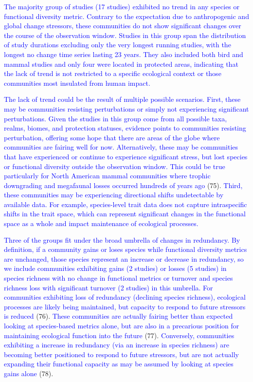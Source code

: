 \documentclass{article}
\begin{document}
\textcolor{blue}{The majority group of studies (17 studies) exhibited no trend in any species or functional diversity metric. Contrary to the expectation due to anthropogenic and global change stressors, these communities do not show significant changes over the course of the observation window. Studies in this group span the distribution of study durations excluding only the very longest running studies, with the longest no change time series lasting 23 years. They also included both bird and mammal studies and only four were located in protected areas, indicating that the lack of trend is not restricted to a specific ecological context or those communities most insulated from human impact.}

\textcolor{blue}{The lack of trend could be the result of multiple possible scenarios. First, these may be communities resisting perturbations or simply not experiencing significant perturbations. Given the studies in this group come from all possible taxa, realms, biomes, and protection statuses, evidence points to communities resisting perturbation, offering some hope that there are areas of the globe where communities are fairing well for now. Alternatively, these may be communities that have experienced or continue to experience significant stress, but lost species or functional diversity outside the observation window. This could be true particularly for North American mammal communities where trophic downgrading and megafaunal losses occurred hundreds of years ago }(75).
\textcolor{blue}{Third, these communities may be experiencing directional shifts undetectable by available data. For example, species-level trait data does not capture intraspecific shifts in the trait space, which can represent significant changes in the functional space as a whole and impact maintenance of ecological processes.}

\textcolor{blue}{Three of the groups fit under the broad umbrella of changes in redundancy. By definition, if a community gains or loses species while functional diversity metrics are unchanged, those species represent an increase or decrease in redundancy, so we include communities exhibiting gains (2 studies) or losses (5 studies) in species richness with no change in functional metrics or turnover and species richness loss with significant turnover (2 studies) in this umbrella. For communities exhibiting loss of redundancy (declining species richness), ecological processes are likely being maintained, but capacity to respond to future stressors is reduced }(76).
\textcolor{blue}{These communities are actually fairing better than expected looking at species-based metrics alone, but are also in a precarious position for maintaining ecological function into the future }(77).
\textcolor{blue}{Conversely, communities exhibiting a increase in redundancy (via an increase in species richness) are becoming better positioned to respond to future stressors, but are not actually expanding their functional capacity as may be assumed by looking at species gains alone}
(78).
\end{document}

